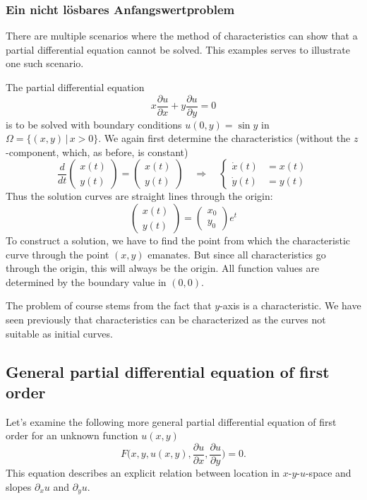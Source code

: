 \subsubsection{Ein nicht lösbares Anfangswertproblem\label{unloesbar}}
There are multiple scenarios where the method of characteristics can 
show that a partial differential equation cannot be solved.
This examples serves to illustrate one such scenario.

The partial differential equation
\[
x\frac{\partial u}{\partial x}
+
y\frac{\partial u}{\partial y}
=0
\]
is to be solved with boundary conditions
$u(0,y)=\sin y$
in $\Omega=\{(x,y)\,|\, x>0\}$.
We again first determine the characteristics (without the $z$-component,
which, as before, is constant)
\[
\frac{d}{dt}
\begin{pmatrix}
x(t)\\y(t)
\end{pmatrix}
=
\begin{pmatrix}
x(t)\\y(t)
\end{pmatrix}
\quad
\Rightarrow
\quad
\left\{
\begin{aligned}
\dot x(t)&=x(t)\\
\dot y(t)&=y(t)
\end{aligned}
\right.
\]
Thus the solution curves are straight lines through the origin:
\[
\begin{pmatrix}
x(t)\\y(t)
\end{pmatrix}
=\begin{pmatrix}x_0\\y_0\end{pmatrix}e^t
\]
To construct a solution, we have to find the point from which the 
characteristic curve through the point $(x,y)$ emanates.
But since all characteristics go through the origin, this will always
be the origin.
All function values are determined by the boundary value in $(0,0)$.

The problem of course stems from the fact that $y$-axis is a characteristic.
We have seen previously that characteristics can be characterized as the
curves not suitable as initial curves.

\subsection{General partial differential equation of first order}
Let's examine the following more general partial differential equation of first
order for an unknown function $u(x,y)$
\begin{equation}
F\biggl(
x,y,u(x,y),\frac{\partial u}{\partial x},\frac{\partial u}{\partial y}
\biggr)=0.
\label{skript:generalpde}
\end{equation}
This equation describes an explicit relation between location in
$x$-$y$-$u$-space and slopes 
$\partial_xu$ and $\partial_yu$.

